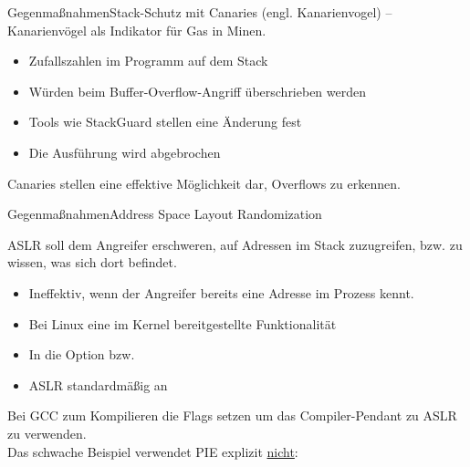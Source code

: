 \begin{frame}{Gegenmaßnahmen}{Stack-Schutz mit Canaries} 
    (engl. Kanarienvogel) -- Kanarienvögel als
    Indikator für Gas in Minen. 
    \vspace{1em}
    \begin{itemize}
        \item  Zufallszahlen im Programm auf dem Stack 
        \item  Würden beim Buffer-Overflow-Angriff überschrieben werden
        \item  Tools wie StackGuard stellen eine Änderung fest
        \item Die Ausführung wird abgebrochen
    \end{itemize}
    \vspace{1em}
    Canaries stellen eine effektive Möglichkeit dar, Overflows zu erkennen.
    
\end{frame}




\begin{frame}{Gegenmaßnahmen}{Address Space Layout Randomization} 
   
    
    ASLR soll dem Angreifer erschweren,
    auf Adressen im Stack zuzugreifen, bzw. zu wissen, was sich dort befindet.
    \vspace{1em}    
    \begin{itemize}
        \item Ineffektiv, wenn der Angreifer bereits eine Adresse im Prozess kennt.
        \item Bei Linux eine im Kernel bereitgestellte Funktionalität
        \item In  die Option  bzw. 
        \item ASLR standardmäßig an
    \end{itemize}
    
    Bei GCC zum Kompilieren die Flags 
    setzen um das Compiler-Pendant zu ASLR zu verwenden.\\
    Das schwache Beispiel verwendet PIE explizit \underline{nicht}:\\ 
       
    
    \end{frame}


